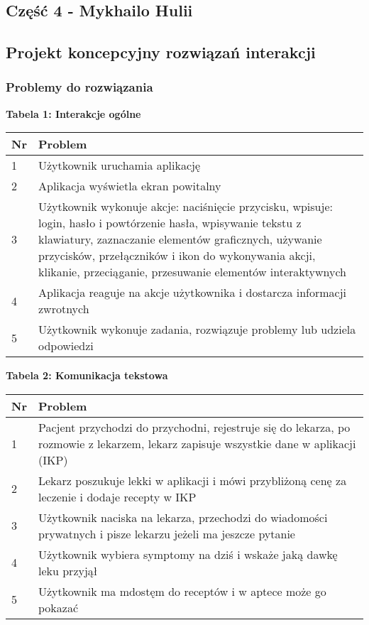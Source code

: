 \begin{center}
  \section{Część 4 - Mykhailo Hulii}
  \subsection{Projekt koncepcyjny rozwiązań interakcji}
\end{center}

\subsubsection{Problemy do rozwiązania}

\textbf{Tabela 1: Interakcje ogólne}
\begin{table}[h]
  \begin{tabular}{|p{1cm}|p{\dimexpr\textwidth-1cm\relax}|} \hline
    \textbf{Nr} & \textbf{Problem} \\\hline
    1 & Użytkownik uruchamia aplikację \\\hline
    2 & Aplikacja wyświetla ekran powitalny \\\hline
    3 & Użytkownik wykonuje akcje: naciśnięcie przycisku, wpisuje: login, hasło i powtórzenie hasła, wpisywanie tekstu z klawiatury, zaznaczanie elementów graficznych, używanie przycisków, przełączników i ikon do wykonywania akcji, klikanie, przeciąganie, przesuwanie elementów interaktywnych \\\hline
    4 & Aplikacja reaguje na akcje użytkownika i dostarcza informacji zwrotnych \\\hline
    5 & Użytkownik wykonuje zadania, rozwiązuje problemy lub udziela odpowiedzi \\\hline
  \end{tabular}
\end{table}

\textbf{Tabela 2: Komunikacja tekstowa}
\begin{table}[h]
  \begin{tabular}{|p{1cm}|p{\dimexpr\textwidth-1cm\relax}|} \hline
    \textbf{Nr} & \textbf{Problem} \\\hline
    1 & Pacjent przychodzi do przychodni, rejestruje się do lekarza, po rozmowie z lekarzem, lekarz zapisuje wszystkie dane w aplikacji (IKP) \\\hline
    2 & Lekarz poszukuje lekki w aplikacji i mówi przybliżoną cenę za leczenie i dodaje recepty w IKP \\\hline
    3 & Użytkownik naciska na lekarza, przechodzi do wiadomości prywatnych i pisze lekarzu jeżeli ma jeszcze pytanie \\\hline
    4 & Użytkownik wybiera symptomy na dziś i wskaże jaką dawkę leku przyjął \\\hline
    5 & Użytkownik ma mdostęm do receptów i w aptece może go pokazać \\\hline
  \end{tabular}
\end{table}

